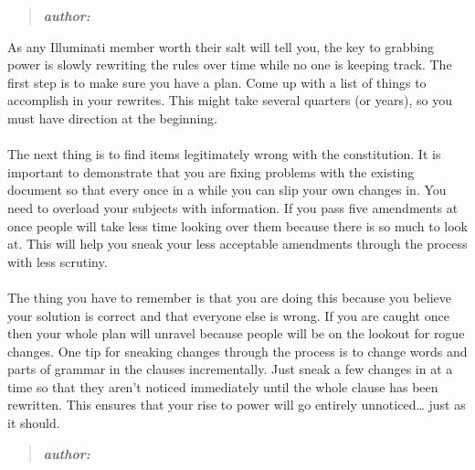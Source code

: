 \documentclass[9pt]{extarticle}
\begin{document}
%
%
\begin{minipage}[t]{.61\linewidth} %
\vspace{-0.4cm}
\hypertarget{firstnews}{}
\begin{quote}
\centering
\textbf{\textit{author: }}
\end{quote}

As any Illuminati member worth their salt will tell you, the key to grabbing 
power is slowly rewriting the rules over time while no one is keeping track. 
The first step is to make sure you have a plan. Come up with a list of things 
to accomplish in your rewrites. This might take several quarters (or years), 
so you must have direction at the beginning.  \\
\\
The next thing is to find items legitimately wrong with the constitution. It is important to demonstrate that you are fixing problems with the existing 
document so that every once in a while you can slip your own changes in. 
You need to overload your subjects with information. If you pass five 
amendments at once people will take less time looking over them because there
is so much to look at. This will help you sneak your less acceptable amendments
through the process with less scrutiny. \\
\\
The thing you have to remember is that you are doing this because you believe
your solution is correct and that everyone else is wrong. If you are caught 
once then your whole plan will unravel because people will be on the lookout for rogue changes. One tip for sneaking changes through the process is to change words
and parts of grammar in the clauses incrementally. Just sneak a few changes in 
at a time so that they aren't noticed immediately until the whole clause has 
been rewritten. This ensures that your rise to power will go entirely 
unnoticed… just as it should.


\hypertarget{secondnews}{} 
\begin{quote}
\centering
\textbf{\textit{author: }}
\end{quote}


\end{minipage}
\end{document}
